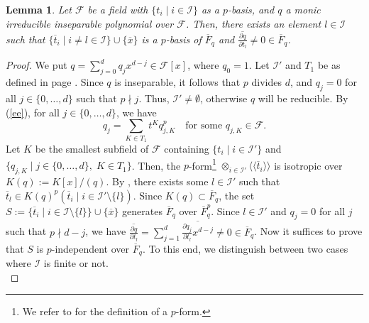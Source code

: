 \documentclass[times,10pt]{amsart}
\newcommand{\F}{\ensuremath{\mathcal{F}}}
\newcommand{\I}{\ensuremath{\mathcal{I}}}
\newtheorem{lemma}[thm]{Lemma}%
\begin{document}
\begin{lemma}\label{lepbas} Let $\F$ be a field with $\{t_i\mid  i\in \I\}$  as a $p$-basis, and  
       $ q$ a monic irreducible  inseparable polynomial over $\F$.  Then, there exists {an element} $l\in \I$ such that $ \{ \overline{t}_i\mid i\neq l\in \I\}\cup \{\overline{x}\}$ is a $p$-basis of $\overline{F}_q$ and $ \overline{\frac{\partial q}{\partial t_l}}\neq 0\in \overline{F}_q$. 
\end{lemma}
\begin{proof}  
{We put} $q= \sum_{j=0}^{d} q_jx^{d-j}\in \F[x]$, where $q_0=1$.  Let $\I'$ and $T_1$ be as defined in page \pageref{pagf}.  Since $q$ is inseparable, {it follows that $p$ divides $d$, and}  $q_j=0$ for all $j\in \{0,\ldots,d\}$ such that   $p\nmid j$.  Thus, $\I'\neq \emptyset$, otherwise  $q$ will be  reducible. By (\ref{ee}), for all $j\in \{0,\ldots,d\}$, we have  $$   q_{j}=\sum_{K\in T_1} t^K q^p_{j,K}\quad \text{for some $q_{j,K}\in \F$.}$$   Let $K$ be the smallest subfield of $\F$ containing $\{t_i\mid i\in \I'\}$ and $\{q_{j,K}\mid j\in \{0,\ldots, d\},\; K\in T_1\}$.  Then, the $p$-form\footnote[6]{We refer to \cite{Hoffmann1} for  the definition of a $p$-form.} $\otimes_{i\in \I'} \langle\langle \overline{t}_i\rangle \rangle$ is isotropic over $K(q):=K[x]/(q)$. By \cite[Corollary 4.10]{Hoffmann1},  there exists some $l\in \I'$ such that $ \overline{t}_l\in K(q)^p( \overline{t}_i\mid i\in\I'\setminus\{l\})$. Since $K(q)\subset \overline{F}_q$,  the set $S:=\{ \overline{t}_i\mid i\in \I\setminus\{l\}\}\cup \{\overline{x}\}$  generates $\overline{F}_q$ over $\overline{F}_q^p$. Since $l\in \I'$ and $q_j=0$ for all $j$ such that $p\nmid d-j$, we have $\overline{\frac{\partial q}{\partial t_l}}= \sum_{j=1}^{d}\overline{\frac{\partial q_j}{\partial t_l} x^{d-j}}\neq 0\in \overline{F}_q$. Now it suffices to prove that  $S$ is $p$-independent over $\overline{F}_q$.  To this end, we {distinguish between two cases where} $\I$ is finite or not.\\


\end{proof}
\end{document}
